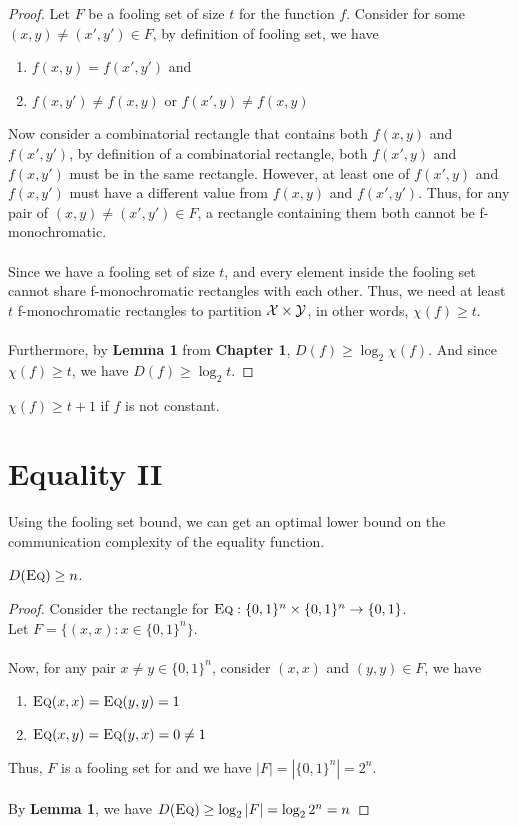 \begin{proof}
	Let $F$ be a fooling set of size $t$ for the function $f$. Consider for some $(x,y) \neq (x',y') \in F$, by definition of fooling set, we have
	\begin{enumerate} 
		\item $f(x,y) = f(x',y')$ and 
		\item $f(x,y') \neq f(x,y)$ or $f(x',y) \neq f(x,y)$ 
	\end{enumerate}
	Now consider a combinatorial rectangle that contains both $f(x,y)$ and $f(x',y')$, by definition of a combinatorial rectangle, both $f(x',y )$ and $f(x,y')$ must be in the same rectangle. However, at least one of $f(x',y )$ and $f(x,y')$ must have a different value from $f(x,y)$ and $f(x',y')$. Thus, for any pair of $(x,y) \neq (x',y') \in F$, a rectangle containing them both cannot be f-monochromatic.\\
	\\
	Since we have a fooling set of size $t$, and every element inside the fooling set cannot share f-monochromatic rectangles with each other. Thus, we need at least $t$ f-monochromatic rectangles to partition $\mathcal{X} \times \mathcal{Y}$, in other words, $\chi(f) \ge t$.\\
	\\
	Furthermore, by \textbf{Lemma 1} from \textbf{Chapter 1}, $D(f) \ge \log_2 \chi(f)$. And since $\chi(f) \ge t$, we have $D(f) \ge \log_2 t$.
\end{proof}

\begin{exercise}
	$\chi(f) \ge t+1$ if $f$ is not constant.
\end{exercise}
\section{Equality II}

Using the fooling set bound, we can get an optimal lower bound on the communication complexity of the equality function.

\begin{theorem}
	$D(\textsc{Eq}) \ge n$.
\end{theorem}

\begin{proof}
	Consider the rectangle for $\textsc{Eq} : \{0,1\}^n \times \{0,1\}^n \rightarrow \{0,1\}$.\\
	Let $F = \{(x,x): x \in \{0,1\}^n\}$. \\
	\\
	Now, for any pair $x \neq y \in \{0,1\}^n$, consider $(x,x)$ and $(y,y) \in F$, we have 
	\begin{enumerate}
		\item $\textsc{Eq}(x,x) = \textsc{Eq}(y,y) = 1$
		\item $\textsc{Eq}(x,y) = \textsc{Eq}(y,x) = 0 \neq 1$
	\end{enumerate} 
	Thus, $F$ is a fooling set for \Eq and we have $|F| = |\{0,1\}^n| = 2^n$. \\ 
	\\
	By \textbf{Lemma 1}, we have $D(\textsc{Eq}) \ge \log_2 |F| = \log_2 2^n = n$
\end{proof}

